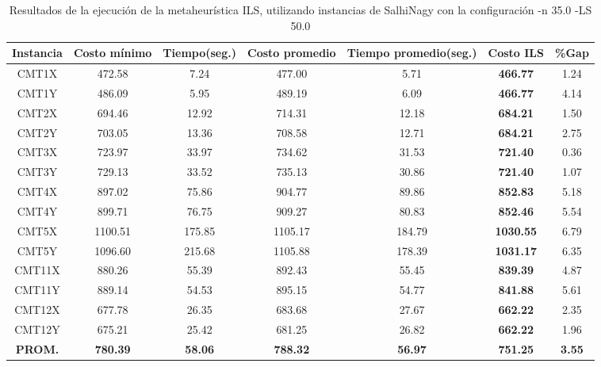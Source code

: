 \begin{table}[ht]
\caption{Resultados de la ejecución de la metaheurística ILS, utilizando instancias de SalhiNagy con la configuración -n 35.0 -LS 50.0}
\centering
\small
\begin{tabular}{c c c c c c c}
\hline\hline
Instancia & Costo mínimo & Tiempo(seg.) & Costo promedio & Tiempo promedio(seg.) & Costo ILS & \%Gap \\ [0.5ex]
\hline
CMT1X & 472.58 & 7.24 & 
477.00 & 5.71 & \bf{466.77} & 
1.24\\CMT1Y & 486.09 & 5.95 & 
489.19 & 6.09 & \bf{466.77} & 
4.14\\CMT2X & 694.46 & 12.92 & 
714.31 & 12.18 & \bf{684.21} & 
1.50\\CMT2Y & 703.05 & 13.36 & 
708.58 & 12.71 & \bf{684.21} & 
2.75\\CMT3X & 723.97 & 33.97 & 
734.62 & 31.53 & \bf{721.40} & 
0.36\\CMT3Y & 729.13 & 33.52 & 
735.13 & 30.86 & \bf{721.40} & 
1.07\\CMT4X & 897.02 & 75.86 & 
904.77 & 89.86 & \bf{852.83} & 
5.18\\CMT4Y & 899.71 & 76.75 & 
909.27 & 80.83 & \bf{852.46} & 
5.54\\CMT5X & 1100.51 & 175.85 & 
1105.17 & 184.79 & \bf{1030.55} & 
6.79\\CMT5Y & 1096.60 & 215.68 & 
1105.88 & 178.39 & \bf{1031.17} & 
6.35\\CMT11X & 880.26 & 55.39 & 
892.43 & 55.45 & \bf{839.39} & 
4.87\\CMT11Y & 889.14 & 54.53 & 
895.15 & 54.77 & \bf{841.88} & 
5.61\\CMT12X & 677.78 & 26.35 & 
683.68 & 27.67 & \bf{662.22} & 
2.35\\CMT12Y & 675.21 & 25.42 & 
681.25 & 26.82 & \bf{662.22} & 
1.96\\\bf{PROM.} & 
\bf{780.39} & \bf{58.06} & \bf{788.32} & \bf{56.97} & \bf{751.25} & \bf{3.55}\\[1ex]\hline
\end{tabular}
\label{table:nonlin}
\end{table} \clearpage

